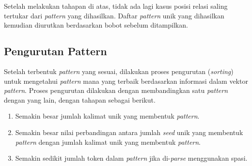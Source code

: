 \noindent Setelah melakukan tahapan di atas, tidak ada lagi kasus posisi relasi saling tertukar dari \textit{pattern} yang dihasilkan. Daftar \textit{pattern} unik yang dihasilkan kemudian diurutkan berdasarkan bobot sebelum ditampilkan.
%


\subsection{Pengurutan Pattern}
Setelah terbentuk \textit{pattern} yang sesuai, dilakukan proses pengurutan (\textit{sorting}) untuk mengetahui \textit{pattern} mana yang terbaik berdasarkan informasi dalam vektor \textit{pattern}. Proses pengurutan dilakukan dengan membandingkan satu \textit{pattern} dengan yang lain, dengan tahapan sebagai berikut.
\begin{enumerate}
  \item Semakin besar jumlah kalimat unik yang membentuk \textit{pattern}.
  \item Semakin besar nilai perbandingan antara jumlah \textit{seed} unik yang membentuk \textit{pattern} dengan jumlah kalimat unik yang membentuk \textit{pattern}.
  \item Semakin sedikit jumlah token dalam \textit{pattern} jika di-\textit{parse} menggunakan spasi.
\end{enumerate}


